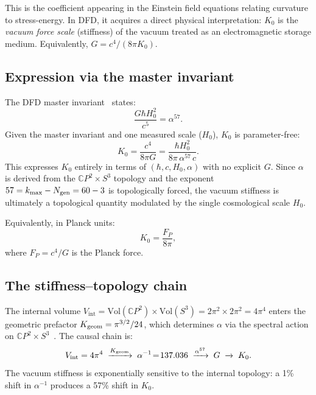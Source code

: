 \documentclass[aps,prd,twocolumn,superscriptaddress,nofootinbib]{revtex4-2}
\newcommand{\CP}{\mathbb{C}P}
\newcommand{\Vint}{V_{\mathrm{int}}}
\begin{document}
This is the coefficient appearing in the Einstein field equations
relating curvature to stress-energy.  In DFD, it acquires a direct
physical interpretation: $K_0$ is the \emph{vacuum force scale}
(stiffness) of the vacuum treated as an electromagnetic storage
medium.  Equivalently, $G = c^4/(8\pi K_0)$.

\subsection{Expression via the master invariant}

The DFD master invariant~\cite{Alcock2025AbInitio} states:
\begin{equation}
\frac{G\hbar H_0^2}{c^5} = \alpha^{57}.
\label{eq:master-invariant}
\end{equation}
Given the master invariant and one measured scale ($H_0$), $K_0$ is
parameter-free:
\begin{equation}
K_0 = \frac{c^4}{8\pi G}
= \frac{\hbar H_0^2}{8\pi\,\alpha^{57}\,c}.
\label{eq:K0-from-invariant}
\end{equation}
This expresses $K_0$ entirely in terms of $(\hbar, c, H_0, \alpha)$
with no explicit $G$.  Since $\alpha$ is derived from the $\CP^2
\times S^3$ topology and the exponent $57 = k_{\max} - N_{\rm gen} =
60 - 3$ is topologically forced, the vacuum stiffness is ultimately a
topological quantity modulated by the single cosmological scale $H_0$.

Equivalently, in Planck units:
\begin{equation}
K_0 = \frac{F_P}{8\pi},
\label{eq:K0-planck}
\end{equation}
where $F_P = c^4/G$ is the Planck force.

\subsection{The stiffness--topology chain}

The internal volume
$\Vint = \mathrm{Vol}(\CP^2)\times\mathrm{Vol}(S^3)
= 2\pi^2 \times 2\pi^2 = 4\pi^4$
enters the geometric prefactor
$K_{\rm geom} = \pi^{3/2}/24$, which determines $\alpha$ via the
spectral action on $\CP^2 \times S^3$~\cite{Alcock2025AbInitio}.  The
causal chain is:
\begin{equation}
\Vint = 4\pi^4
\;\xrightarrow{K_{\rm geom}}\; \alpha^{-1} \!=\! 137.036
\;\xrightarrow{\alpha^{57}}\; G
\;\xrightarrow{}\; K_0.
\end{equation}
The vacuum stiffness is exponentially sensitive to the internal
topology: a 1\% shift in $\alpha^{-1}$ produces a 57\% shift in $K_0$.
\end{document}
